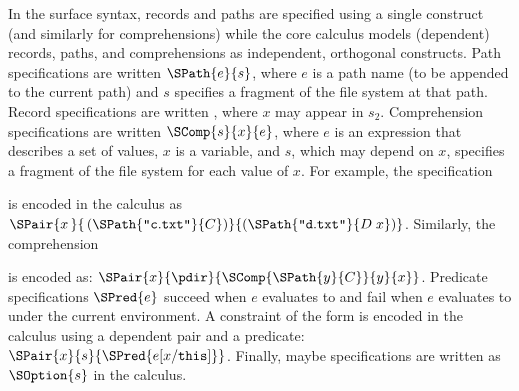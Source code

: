 

In the \forest{} surface syntax, records and paths are specified using
a single construct (and similarly for comprehensions) while the core
calculus models (dependent) records, paths, and comprehensions as
independent, orthogonal constructs.  Path specifications are written
$\SPath{e}{s}$, where $e$ is a path name (to be appended to the
current path) and $s$ specifies a fragment of the file system at that
path. Record specifications are written , where $x$
may appear in $s_2$. Comprehension specifications are written
$\SComp{s}{x}{e}$, where $e$ is an expression that describes a set of
values, $x$ is a variable, and $s$, which may depend on $x$, specifies
a fragment of the file system for each value of $x$.  For example, the
specification
\begin{center}
\end{center}
is encoded in the calculus as
%
\(
\SPair{x\,}{\,(\SPath{\texttt{"}\mathtt{c.txt}\texttt{"}}{C})}{(\SPath{\texttt{"}\mathtt{d.txt}\texttt{"}}{D\; x})} 
\).
Similarly, the comprehension
\begin{center}
\cd{[c :: C | c <- \kw{matches} (GL "*")]} 
\end{center}
is encoded as: \(\SPair{x}{\pdir}{\SComp{\SPath{y}{C}}{y}{x}}
\). Predicate specifications $\SPred{e}$ succeed when $e$ evaluates to
\True{} and fail when $e$ evaluates to \False{} under the current
environment.  A \forest{} constraint of the form 
is encoded in the calculus using a dependent pair and a predicate:
$\SPair{x}{s}{\SPred{e[x/\mathtt{this}]}}$. Finally, maybe
specifications are written as $\SOption{s}$ in the calculus.

